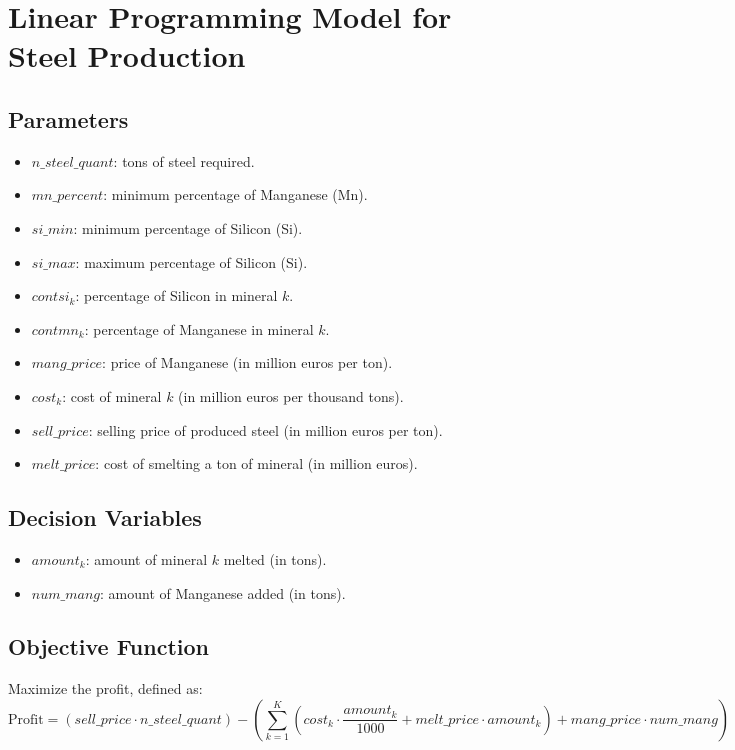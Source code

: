 \documentclass{article}
\begin{document}
\section*{Linear Programming Model for Steel Production}

\subsection*{Parameters}
\begin{itemize}
    \item $n\_steel\_quant$: tons of steel required.
    \item $mn\_percent$: minimum percentage of Manganese (Mn).
    \item $si\_min$: minimum percentage of Silicon (Si).
    \item $si\_max$: maximum percentage of Silicon (Si).
    \item $contsi_k$: percentage of Silicon in mineral $k$.
    \item $contmn_k$: percentage of Manganese in mineral $k$.
    \item $mang\_price$: price of Manganese (in million euros per ton).
    \item $cost_k$: cost of mineral $k$ (in million euros per thousand tons).
    \item $sell\_price$: selling price of produced steel (in million euros per ton).
    \item $melt\_price$: cost of smelting a ton of mineral (in million euros).
\end{itemize}

\subsection*{Decision Variables}
\begin{itemize}
    \item $amount_k$: amount of mineral $k$ melted (in tons).
    \item $num\_mang$: amount of Manganese added (in tons).
\end{itemize}

\subsection*{Objective Function}
Maximize the profit, defined as:
\[
\text{Profit} = (sell\_price \cdot n\_steel\_quant) - \left( \sum_{k=1}^{K} \left( cost_k \cdot \frac{amount_k}{1000} + melt\_price \cdot amount_k \right) + mang\_price \cdot num\_mang \right)
\]
\end{document}

